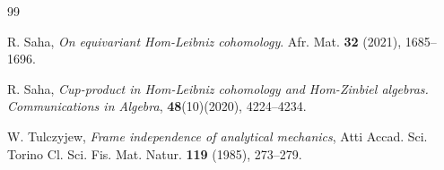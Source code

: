 \documentclass[14pt]{article}
\theoremstyle{Definition}
\theoremstyle{remark}
\begin{document}
\begin{thebibliography}{99}

 R. Saha, \textit{On equivariant Hom-Leibniz cohomology}. Afr. Mat. \textbf{32} (2021), 1685--1696.
 
 R. Saha, \textit{Cup-product in Hom-Leibniz cohomology and Hom-Zinbiel algebras. Communications in Algebra}, \textbf{48}(10)(2020), 4224--4234.

W. Tulczyjew,
\textit{Frame independence of analytical mechanics},
Atti Accad. Sci. Torino Cl. Sci. Fis. Mat. Natur.
\textbf{119} (1985), 273--279.

\end{thebibliography}
\end{document}
